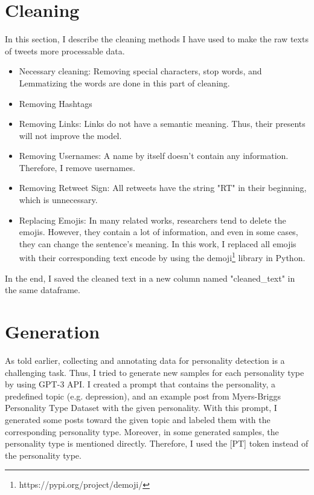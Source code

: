 
\section{Cleaning}
In this section, I describe the cleaning methods I have used to make the raw texts of tweets more processable data.
\begin{itemize}
    \item Necessary cleaning: Removing special characters, stop words, and Lemmatizing the words are done in this part of cleaning.
    \item Removing Hashtags
    \item Removing Links: Links do not have a semantic meaning. Thus, their presents will not improve the model.
    \item Removing Usernames: A name by itself doesn't contain any information. Therefore, I remove usernames.
    \item Removing Retweet Sign: All retweets have the string "RT" in their beginning, which is unnecessary. 
    \item Replacing Emojis: In many related works, researchers tend to delete the emojis. However, they contain a lot of information, and even in some cases, they can change the sentence's meaning. In this work, I replaced all emojis with their corresponding text encode by using the demoji\footnote{https://pypi.org/project/demoji/} library in Python.
\end{itemize}

In the end, I saved the cleaned text in a new column named "cleaned\_text" in the same dataframe.



\section{Generation}
As told earlier, collecting and annotating data for personality detection is a challenging task. Thus, I tried to generate new samples for each personality type by using GPT-3 API. I created a prompt that contains the personality, a predefined topic (e.g. depression), and an example post from Myers-Briggs Personality Type Dataset with the given personality. With this prompt, I generated some posts toward the given topic and labeled them with the corresponding personality type.
Moreover, in some generated samples, the personality type is mentioned directly. Therefore, I used the [PT] token instead of the personality type.

